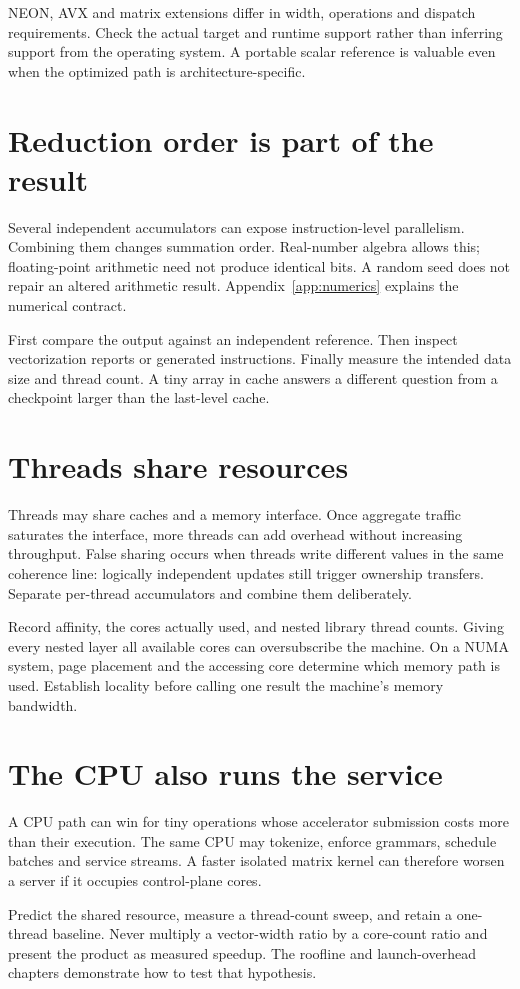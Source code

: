 NEON, AVX and matrix extensions differ in width, operations and dispatch
requirements. Check the actual target and runtime support rather than
inferring support from the operating system. A portable scalar reference
is valuable even when the optimized path is architecture-specific.

\section{Reduction order is part of the result}
Several independent accumulators can expose instruction-level parallelism.
Combining them changes summation order. Real-number algebra allows this;
floating-point arithmetic need not produce identical bits. A random seed
does not repair an altered arithmetic result. Appendix~\ref{app:numerics}
explains the numerical contract.

First compare the output against an independent reference. Then inspect
vectorization reports or generated instructions. Finally measure the
intended data size and thread count. A tiny array in cache answers a
different question from a checkpoint larger than the last-level cache.

\section{Threads share resources}
Threads may share caches and a memory interface. Once aggregate traffic
saturates the interface, more threads can add overhead without increasing
throughput. False sharing occurs when threads write different values in
the same coherence line: logically independent updates still trigger
ownership transfers. Separate per-thread accumulators and combine them
deliberately.

Record affinity, the cores actually used, and nested library thread counts.
Giving every nested layer all available cores can oversubscribe the
machine. On a NUMA system, page placement and the accessing core determine
which memory path is used. Establish locality before calling one result
the machine's memory bandwidth.

\section{The CPU also runs the service}
A CPU path can win for tiny operations whose accelerator submission costs
more than their execution. The same CPU may tokenize, enforce grammars,
schedule batches and service streams. A faster isolated matrix kernel can
therefore worsen a server if it occupies control-plane cores.

Predict the shared resource, measure a thread-count sweep, and retain a
one-thread baseline. Never multiply a vector-width ratio by a core-count
ratio and present the product as measured speedup. The roofline and
launch-overhead chapters demonstrate how to test that hypothesis.
